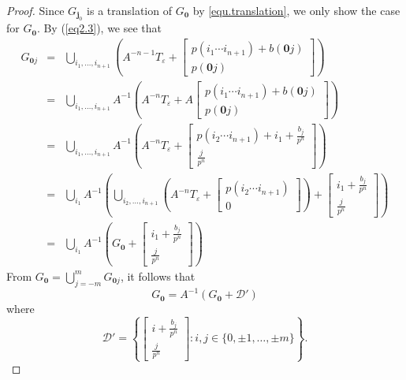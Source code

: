 \documentclass[12pt, reqno]{amsart}
\numberwithin{equation}{section}
\begin{document}
\begin{proof}
Since $G_{{\mathbf j}_0}$ is a translation of $G_{{\mathbf 0}}$ by \eqref{equ.translation}, we only show the case for $G_{{\mathbf 0}}$.
By (\ref{eq2.3}), we see that
\begin{eqnarray*}
G_{{\mathbf 0}j}&=& \bigcup_{i_1,\dots, i_{n+1}}\left(A^{-n-1}T_\varepsilon+\left[\begin{array}{c}
p(i_1\cdots i_{n+1})+b({\mathbf 0}j)\\
p({\mathbf 0}j)
\end{array}\right]\right) \\
&=& \bigcup_{i_1,\dots, i_{n+1}}A^{-1}\left(A^{-{n}}T_\varepsilon+ A\left[\begin{array}{c}
p(i_1\cdots i_{n+1})+b({\mathbf 0}j)\\
p({\mathbf 0}j)
\end{array}\right]\right) \\
&=& \bigcup_{i_1,\dots, i_{n+1}}A^{-1}\left(A^{-{n}}T_\varepsilon+\left[\begin{array}{c}
p(i_2\cdots i_{n+1})+i_1+\frac{b_j}{p^n}\\
\frac{j}{p^n}
\end{array}\right]\right) \\
&=& \bigcup_{i_1}A^{-1}\left(\bigcup_{i_2,\dots,i_{n+1}}\left(A^{-{n}}T_\varepsilon+\left[\begin{array}{c}
p(i_2\cdots i_{n+1})\\
0
\end{array}\right]\right)+\left[\begin{array}{c}
i_1+\frac{b_j}{p^n}\\
\frac{j}{p^n}
\end{array}\right]\right) \\
&=& \bigcup_{i_1}A^{-1}\left(G_{\mathbf 0}+\left[\begin{array}{c}
i_1+\frac{b_j}{p^n}\\
\frac{j}{p^n}
\end{array}\right]\right)
\end{eqnarray*}
From $G_{\mathbf 0}=\bigcup_{j=-m}^{m}G_{{\mathbf 0}j}$, it follows that
\begin{equation}\label{eq2.5}
G_{\mathbf 0}=A^{-1}(G_{\mathbf 0}+{\mathcal D}')
\end{equation}
where
$${\mathcal D}'=\left\{\left[\begin{array}{c}i+\frac{b_j}{p^n}\\ \frac{j}{p^n}\end{array}\right]: i,j\in\{0,\pm1,\dots,\pm m\}\right\}.$$

\end{proof}
\end{document}
